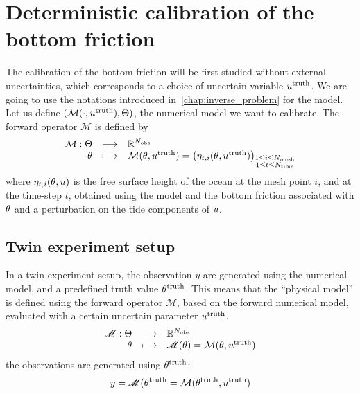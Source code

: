 \documentclass[../../Main_ManuscritThese.tex]{subfiles}
\begin{document}
\section{Deterministic calibration of the bottom friction}
\label{sec:deterministic_calibration_bott}
The calibration of the bottom friction will be first studied without
external uncertainties, which corresponds to a choice of uncertain
variable $u^{\mathrm{truth}}$.
We are going to use the notations introduced
in~\cref{chap:inverse_problem} for the model. Let us define
$(\mathcal{M}(\cdot,u^{\mathrm{truth}}),\Theta)$, the numerical
model we want to calibrate. The forward operator $\mathcal{M}$ is
defined by
\begin{equation}
  \begin{array}{rcl}
    \mathcal{M}: \Theta  &\longrightarrow& \mathbb{R}^{N_{\mathrm{obs}}} \\
    \theta & \longmapsto & \mathcal{M}(\theta, u^{\mathrm{truth}}) = \left(\eta_{t,i}(\theta, u^{\mathrm{truth}})\right)_{\substack{1 \leq i \leq N_{\mathrm{mesh}} \\ 1 \leq t \leq N_{\mathrm{time}}}} \\ 
  \end{array}
\end{equation}
where $\eta_{t,i}(\theta,u)$ is the free surface height of the ocean at
the mesh point $i$, and at the time-step $t$, obtained using the model
and the bottom friction associated with $\theta$ and a perturbation on
the tide components of $u$.

\subsection{Twin experiment setup}
In a twin experiment setup, the observation $y$ are generated using
the numerical model, and a predefined truth value
$\theta^{\mathrm{truth}}$.  This means that the ``physical model'' is
defined using the forward operator $\mathscr{M}$, based on the forward
numerical model, evaluated with a certain uncertain parameter
$u^{\mathrm{truth}}$.
\begin{equation}
  \label{eq:twin_exp}
  \begin{array}{rcl}
    \mathscr{M}: \Theta &\longrightarrow & \mathbb{R}^{N_{\mathrm{obs}}} \\
    \theta & \longmapsto &\mathscr{M}(\theta) = \mathcal{M}(\theta, u^{\mathrm{truth}})
  \end{array}
\end{equation}
the observations are generated using $\theta^{\mathrm{truth}}$:
\begin{equation}
  y = \mathscr{M}(\theta^{\mathrm{truth}} = \mathcal{M}(\theta^{\mathrm{truth}}, u^{\mathrm{truth}})
\end{equation}
\end{document}
